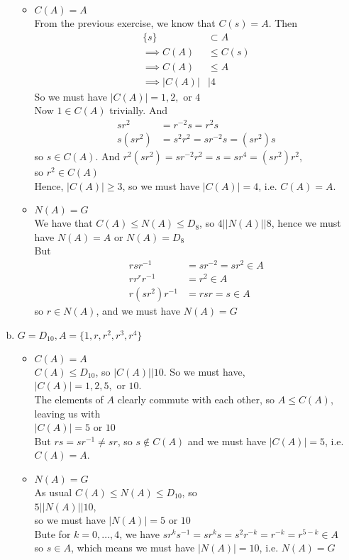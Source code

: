 \documentclass{article}
\newcommand{\set}[1]{ \{ #1 \} }
\newcommand{\inv}[1]{ {#1}^{-1} }
\newcommand{\norm}[1]{|#1|}
\newcommand{\divides}{\big\vert}
\begin{document}
\begin{enumerate}[(a)]
\begin{itemize}
\item $C(A) = A$\\
From the previous exercise, we know that $C(s) = A$. Then
\begin{align*}
\set{s} &\subset A\\
\implies C(A) &\leq C(s)\\
\implies C(A) &\leq A\\
\implies \norm{C(A)} &\divides 4
\end{align*}
So we must have $\norm{C(A)}=1,2,$ or $4$\\
Now $1\in C(A)$ trivially. And
\begin{align*}
sr^2 &= r^{-2}s =r^2s\\
s(sr^2) &= s^2r^2 = sr^{-2}s = (sr^2)s
\end{align*}
so $s \in C(A)$. And $r^2(sr^2) = sr^{-2}r^2 = s = sr^4 = (sr^2)r^2$,\\
so $r^2 \in C(A)$\\
Hence, $\norm{C(A)} \geq 3$, so we must have $\norm{C(A)} = 4$, i.e. $C(A)=A$.
\item $N(A)=G$\\
We have that $C(A) \leq N(A) \leq D_8$, so $4 \divides \norm{N(A)} \divides 8$, hence we must have $N(A)=A$ or $N(A)=D_8$\\
But
\begin{align*}
rs\inv{r} &= sr^{-2} = sr^2 \in A\\
rr^r\inv{r} &= r^2 \in A\\
r(sr^2)\inv{r} &= rsr = s \in A
\end{align*}
so $r \in N(A)$, and we must have $N(A)=G$
\end{itemize}
\item $G=D_{10},A=\set{1,r,r^2,r^3,r^4}$\\
\begin{itemize}
\item $C(A)=A$\\
$C(A) \leq D_{10}$, so $\norm{C(A)} \divides 10$. So we must have,\\
$\norm{C(A)} = 1,2,5,$ or $10$.\\
The elements of $A$ clearly commute with each other, so $A \leq C(A)$, leaving us with\\
$\norm{C(A)}=5$ or $10$\\
But $rs=s\inv{r} \neq sr$, so $s \notin C(A)$ and we must have $\norm{C(A)} = 5$, i.e. $C(A) = A$.
\item $N(A) = G$\\
As usual $C(A) \leq N(A) \leq D_{10}$, so\\
$5 \divides \norm{N(A)} \divides 10$,\\
so we must have $\norm{N(A)} = 5$ or $10$\\
Bute for $k=0,\ldots,4$, we have $sr^k\inv{s} = sr^ks=s^2r^{-k} = r^{-k} = r^{5-k} \in A$\\
so $s\in A$, which means we must have $\norm{N(A)} = 10$, i.e. $N(A) = G$
\end{itemize}
\end{enumerate}
\end{document}
